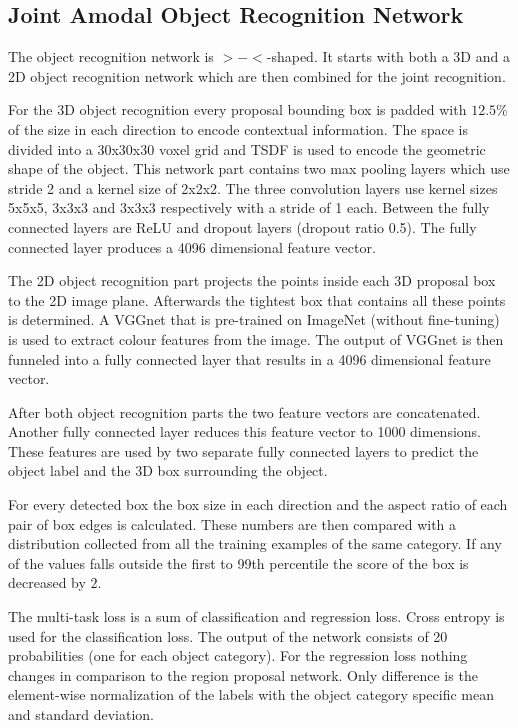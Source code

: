 \documentclass[12pt]{scrartcl}
\begin{document}
\subsection{Joint Amodal Object Recognition Network}

The object recognition network is \(>-<\)-shaped. It starts with both a 3D and a 2D
object recognition network which are then combined for the joint recognition.

For the 3D object recognition every proposal bounding box is padded with \(12.5\%\)
of the size in each direction to encode contextual information. The space is divided
into a 30x30x30 voxel grid and TSDF is used to encode the geometric shape of
the object. This network part contains two max pooling layers which use stride 2
and a kernel size of 2x2x2. The three convolution layers use kernel sizes
5x5x5, 3x3x3 and 3x3x3 respectively with a stride of 1 each. Between the fully connected
layers are ReLU and dropout layers (dropout ratio 0.5). The fully connected
layer produces a 4096 dimensional feature vector.

The 2D object recognition part projects the points inside each 3D proposal box
to the 2D image plane. Afterwards the tightest box that contains all these points
is determined. A VGGnet that is pre-trained on ImageNet (without fine-tuning)
is used to extract colour features from the image. The output of VGGnet is then
funneled into a fully connected layer that results in a 4096 dimensional feature
vector.

After both object recognition parts the two feature vectors are concatenated.
Another fully connected layer reduces this feature vector to 1000 dimensions.
These features are used by two separate fully connected layers to predict the
object label and the 3D box surrounding the object.

For every detected box the box size in each direction and the aspect ratio of
each pair of box edges is calculated. These numbers are then compared with a
distribution collected from all the training examples of the same category.
If any of the values falls outside the first to 99th percentile the score
of the box is decreased by \(2\).

The multi-task loss is a sum of classification and regression loss. Cross entropy
is used for the classification loss. The output of the network consists of 20
probabilities (one for each object category). For the regression loss nothing
changes in comparison to the region proposal network. Only difference is the
element-wise normalization of the labels with the object category specific
mean and standard deviation.
\end{document}
